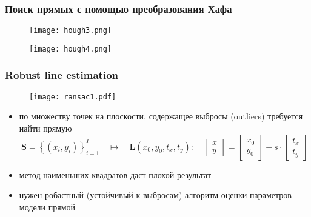 \documentclass[
    12pt, 
    usepdftitle=false,
    aspectratio=1610
]{beamer}
\begin{document}
\begin{frame}
\frametitle{Поиск прямых с помощью преобразования Хафа}
\begin{figure}
    \centering
    \texttt{[image: hough3.png]}
\end{figure}
\begin{figure}
    \centering
    \texttt{[image: hough4.png]}
\end{figure}
\end{frame}

\begin{frame}
\frametitle{Robust line estimation}
\begin{figure}
    \centering
    \texttt{[image: ransac1.pdf]}
\end{figure}
\begin{itemize}
    \item по множеству точек на плоскости, содержащее выбросы (outliers) требуется найти прямую
    $$
        \mathbf{S}=\left\{(x_i, y_i)\right\}_{i=1}^I
        \quad\mapsto\quad
        \mathbf{L}(x_0,y_0,t_x,t_y):\quad
        \begin{bmatrix}
            x \\ y
        \end{bmatrix} =
        \begin{bmatrix}
            x_0 \\ y_0
        \end{bmatrix}+
        s\cdot \begin{bmatrix}
            t_x \\ t_y
        \end{bmatrix}
    $$
    \item метод наименьших квадратов даст плохой результат
    \item нужен робастный (устойчивый к выбросам) алгоритм оценки параметров модели прямой
\end{itemize}
\end{frame}
\end{document}
